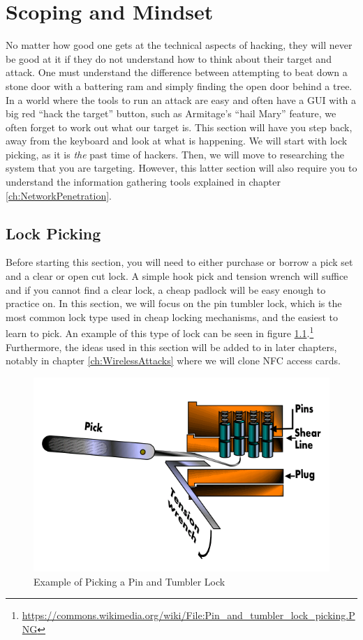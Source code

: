 \chapter{Scoping and Mindset}
	\label{ch:ScopingMindset}
		No matter how good one gets at the technical aspects of hacking, they will never be good at it if they do not understand how to think about their target and attack. 
		One must understand the difference between attempting to beat down a stone door with a battering ram and simply finding the open door behind a tree. 
		In a world where the tools to run an attack are easy and often have a GUI with a big red ``hack the target'' button, 
		such as Armitage's ``hail Mary'' feature, we often forget to work out what our target is. 
		This section will have you step back, away from the keyboard and look at what is happening. 
		We will start with lock picking, as it is \emph{the} past time of hackers. 
		Then, we will move to researching the system that you are targeting. 
		However, this latter section will also require you to understand the information gathering tools explained in chapter \ref{ch:NetworkPenetration}.
	\section{Lock Picking}
		Before starting this section, you will need to either purchase or borrow a pick set and a clear or open cut lock. 
		A simple hook pick and tension wrench will suffice and if you cannot find a clear lock, a cheap padlock will be easy enough to practice on. 
		In this section, we will focus on the pin tumbler lock, which is the most common lock type used in cheap locking mechanisms, and the easiest to learn to pick. 
		An example of this type of lock can be seen in figure \ref{fig:PinTumblerLock}.\footnote{\url{https://commons.wikimedia.org/wiki/File:Pin\_and\_tumbler\_lock\_picking.PNG}}
		Furthermore, the ideas used in this section will be added to in later chapters, notably in chapter \ref{ch:WirelessAttacks} where we will clone NFC access cards. 
		\begin{figure}[htb]
			\centering
			\includegraphics[scale=0.6]{./PinTumblerLock.png}
			\caption{Example of Picking a Pin and Tumbler Lock}
			\label{fig:PinTumblerLock}
		\end{figure}
